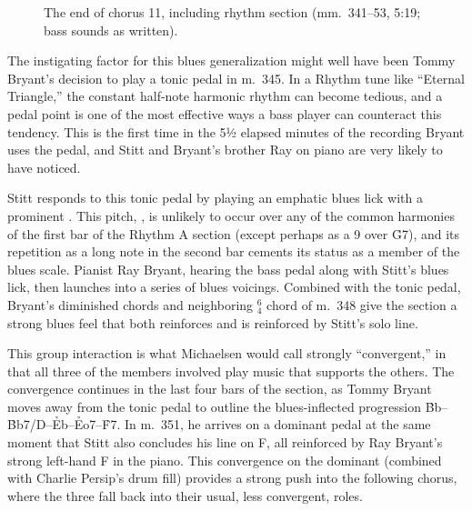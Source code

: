 \begin{figure}[tbp]
  \caption[The end of chorus 11, including rhythm section.]{%
    The end of chorus 11, including rhythm section (mm.~341--53, 5:19; bass
    sounds as written).}
  \label{et:rhythm-sect-11}
\end{figure}

The instigating factor for this blues generalization might well have been
Tommy Bryant's decision to play a tonic pedal in m.~345. In a Rhythm tune like
``Eternal Triangle,'' the constant half-note harmonic rhythm can become
tedious, and a pedal point is one of the most effective ways a bass player can
counteract this tendency. This is the first time in the 5½ elapsed minutes of the
recording Bryant uses the pedal, and Stitt and Bryant's brother Ray on piano
are very likely to have noticed.

Stitt responds to this tonic pedal by playing an emphatic blues lick with a
prominent \Aflat. This pitch, \flat{}, is unlikely to occur over
any of the common harmonies of the first bar of the Rhythm A section (except
perhaps as a \flat{}9 over \h{G7}), and its repetition as a long note in the
second bar cements its status as a member of the \Bflat blues scale.
Pianist Ray Bryant, hearing the bass pedal along with Stitt's blues lick, then
launches into a series of blues voicings. Combined with the tonic pedal,
Bryant's diminished chords and neighboring $^6_4$ chord of m.~348 give the
section a strong blues feel that both reinforces and is reinforced by Stitt's
solo line.

This group interaction is what Michaelsen would call strongly
``convergent,'' in that all three of the members involved play music that
supports the others. The convergence continues in the last four bars
of the section, as Tommy Bryant moves away from the tonic pedal to outline the
blues-inflected progression \h{Bb}--\h{Bb7/D}--\h{Eb}--\h{Eo7}--\h{F7}. In
m.~351, he arrives on a dominant pedal at the same moment that Stitt also
concludes his line on F, all reinforced by Ray Bryant's strong left-hand F in
the piano. This convergence on the dominant (combined with Charlie
Persip's drum fill) provides a strong push into the following chorus, where
the three fall back into their usual, less convergent, roles.

